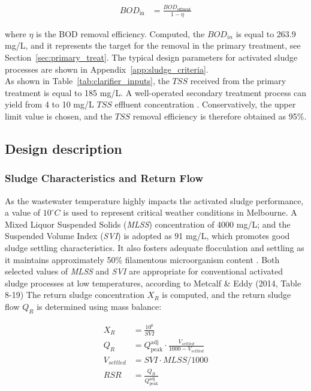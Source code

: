 \documentclass[11pt]{article}
\begin{document}
\begin{align}
BOD_{\text{in}} &= \frac{BOD_{\text{effluent}}}{1 - \eta}
\label{eq:secondary_bod_in}
\end{align}

where \( \eta\) is the BOD removal efficiency. Computed, the $BOD_{in}$ 
is equal to 
263.9
mg/L, and it represents the target for the removal in the primary treatment, 
see Section~\ref{sec:primary_treat}. The typical design parameters for activated 
sludge processes are shown in Appendix~\ref{app:sludge_criteria}.\\
As shown in Table~\ref{tab:clarifier_inputs}, the $TSS$ received from 
the primary treatment is equal to 185 mg/L. A well-operated secondary 
treatment process can yield from 4 to 10 mg/L $TSS$ effluent 
concentration \cite{metcalf_2014_wastewater}. Conservatively, the upper 
limit value is chosen, and the $TSS$ removal efficiency is therefore 
obtained as 95\%.


\subsection{Design description}
\label{sec:design_description_secondary_treat}

\subsubsection{Sludge Characteristics and Return Flow}

As the wastewater temperature highly impacts the activated sludge performance, 
a value of $10^{\circ}C$ is used to represent critical weather conditions in 
Melbourne. A Mixed Liquor Suspended Solids (\textit{MLSS}) concentration of
4000
mg/L; and the Suspended Volume Index (\textit{SVI}) is adopted 
as 
91
mg/L, which promotes good sludge settling characteristics. It also fosters 
adequate flocculation and settling as it maintains approximately 50\% 
filamentous microorganism content \cite{chudoba1973control}. Both selected 
values of 
\textit{MLSS} and \textit{SVI} are appropriate for conventional 
activated sludge processes at low temperatures, according to Metcalf \& Eddy (2014, Table 8-19) 
The return sludge concentration \(X_R\) is computed, and the return sludge 
flow \(Q_R\) is determined using mass balance:

\begin{align}
X_R &= \frac{10^6}{SVI} \\
Q_R &= Q_{\text{peak}}^{\text{adj}} \cdot \frac{V_{settled}}{1000 - V_{settled}}\\
V_{settled} &=SVI \cdot MLSS /1000\\
RSR &=\frac{Q_R}{Q_{\text{peak}}^{\text{adj}}}
\end{align}
\end{document}
